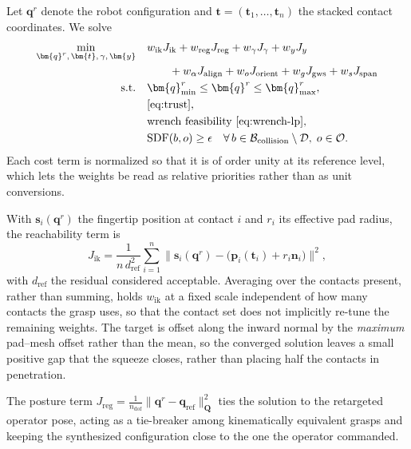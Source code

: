 Let $\bm{q}^r$ denote the robot configuration and
$\bm{t} = (\bm{t}_1,\dots,\bm{t}_n)$ the stacked contact coordinates. We solve
%
\begin{equation}
\begin{aligned}
  \min_{\bm{q}^r,\, \bm{t},\, \gamma,\, \bm{y}} \quad
    & w_{\mathrm{ik}} J_{\mathrm{ik}} + w_{\mathrm{reg}} J_{\mathrm{reg}}
      + w_{\gamma} J_{\gamma} + w_{y} J_{y} \\[-1pt]
    & \qquad + w_{\alpha} J_{\mathrm{align}} + w_{o} J_{\mathrm{orient}}
      + w_{g} J_{\mathrm{gws}} + w_{s} J_{\mathrm{span}} \\
  \text{s.t.}\quad
    & \bm{q}^r_{\min} \le \bm{q}^r \le \bm{q}^r_{\max}, \\
    & \eqref{eq:trust}, \\
    & \text{wrench feasibility } \eqref{eq:wrench-lp}, \\
    & \mathrm{SDF}(b, o) \ge \epsilon
      \quad \forall\, b \in \mathcal{B}_{\mathrm{collision}} \setminus \mathcal{D},\; o \in \mathcal{O}.
\end{aligned}
\label{eq:nlp}
\end{equation}
%
Each cost term is normalized so that it is of order unity at its reference
level, which lets the weights be read as relative priorities rather than as
unit conversions.

With $\bm{s}_i(\bm{q}^r)$ the fingertip position at contact $i$ and $r_i$ its
effective pad radius, the reachability term is
%
\begin{equation}
  J_{\mathrm{ik}} = \frac{1}{n\, d_{\mathrm{ref}}^2} \sum_{i=1}^{n}
    \bigl\lVert \bm{s}_i(\bm{q}^r) - \bigl(\bm{p}_i(\bm{t}_i) + r_i \bm{n}_i \bigr) \bigr\rVert^2 ,
\end{equation}
%
with $d_{\mathrm{ref}}$ the residual considered acceptable. Averaging over the
contacts present, rather than summing, holds $w_{\mathrm{ik}}$ at a fixed scale
independent of how many contacts the grasp uses, so that the contact set does not
implicitly re-tune the remaining weights. The target is offset along the inward normal by the \emph{maximum} pad--mesh
offset rather than the mean, so the converged solution leaves a small positive gap
that the squeeze closes, rather than placing half the contacts in penetration.

The posture term $J_{\mathrm{reg}} = \frac{1}{n_{\mathrm{dof}}}
\lVert \bm{q}^r - \bm{q}_{\mathrm{ref}} \rVert_{\bm{Q}}^2$ ties the solution to the
retargeted operator pose, acting as a tie-breaker among kinematically equivalent
grasps and keeping the synthesized configuration close to the one the operator
commanded.

